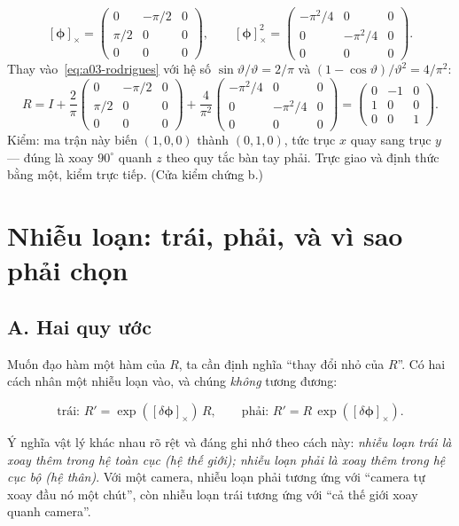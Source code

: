 \documentclass[../../vslam.tex]{subfiles}
\begin{document}
\[
[\boldsymbol{\phi}]_\times = \begin{pmatrix} 0 & -\pi/2 & 0 \\ \pi/2 & 0 & 0 \\ 0&0&0\end{pmatrix},
\qquad
[\boldsymbol{\phi}]_\times^2 = \begin{pmatrix} -\pi^2/4 & 0 & 0 \\ 0 & -\pi^2/4 & 0 \\ 0&0&0\end{pmatrix}.
\]
Thay vào~\eqref{eq:a03-rodrigues} với hệ số \(\sin\vartheta/\vartheta = 2/\pi\) và \((1-\cos\vartheta)/\vartheta^2 = 4/\pi^2\):
\[
R = I + \frac{2}{\pi}\begin{pmatrix} 0 & -\pi/2 & 0 \\ \pi/2 & 0 & 0 \\ 0&0&0\end{pmatrix}
+ \frac{4}{\pi^2}\begin{pmatrix} -\pi^2/4 & 0&0 \\ 0&-\pi^2/4&0 \\ 0&0&0\end{pmatrix}
= \begin{pmatrix} 0 & -1 & 0 \\ 1 & 0 & 0 \\ 0&0&1\end{pmatrix}.
\]
Kiểm: ma trận này biến \((1,0,0)\) thành \((0,1,0)\), tức trục \(x\) quay sang trục \(y\) --- đúng là xoay \(90^\circ\) quanh \(z\) theo quy tắc bàn tay phải. Trực giao và định thức bằng một, kiểm trực tiếp. (Cửa kiểm chứng b.)

\section{Nhiễu loạn: trái, phải, và vì sao phải chọn}

\subsection{A. Hai quy ước}

Muốn đạo hàm một hàm của \(R\), ta cần định nghĩa ``thay đổi nhỏ của \(R\)''. Có hai cách nhân một nhiễu loạn vào, và chúng \emph{không} tương đương:

\[
\text{trái: } R' = \exp([\delta\boldsymbol{\phi}]_\times)\,R,
\qquad
\text{phải: } R' = R\,\exp([\delta\boldsymbol{\phi}]_\times).
\]

Ý nghĩa vật lý khác nhau rõ rệt và đáng ghi nhớ theo cách này: \emph{nhiễu loạn trái là xoay thêm trong hệ toàn cục (hệ thế giới); nhiễu loạn phải là xoay thêm trong hệ cục bộ (hệ thân)}. Với một camera, nhiễu loạn phải tương ứng với ``camera tự xoay đầu nó một chút'', còn nhiễu loạn trái tương ứng với ``cả thế giới xoay quanh camera''.
\end{document}
